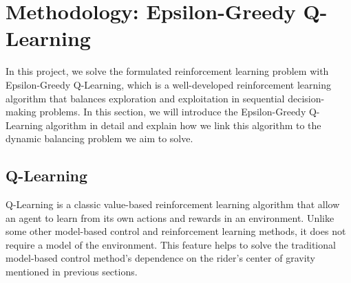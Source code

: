 \documentclass[10pt,a4paper]{article}
\begin{document}
%
%

\section{Methodology: Epsilon-Greedy Q-Learning}
In this project, we solve the formulated reinforcement learning problem with Epsilon-Greedy Q-Learning, which is a well-developed reinforcement learning algorithm that balances exploration and exploitation in sequential decision-making problems. In this section, we will introduce the Epsilon-Greedy Q-Learning algorithm in detail and explain how we link this algorithm to the dynamic balancing problem we aim to solve. 

\subsection{Q-Learning}
Q-Learning is a classic value-based reinforcement learning algorithm that allow an agent to learn from its own actions and rewards in an environment. Unlike some other model-based control and reinforcement learning methods, it does not require a model of the environment. This feature helps to solve the traditional model-based control method's dependence on the rider's center of gravity mentioned in previous sections. 
\end{document}
